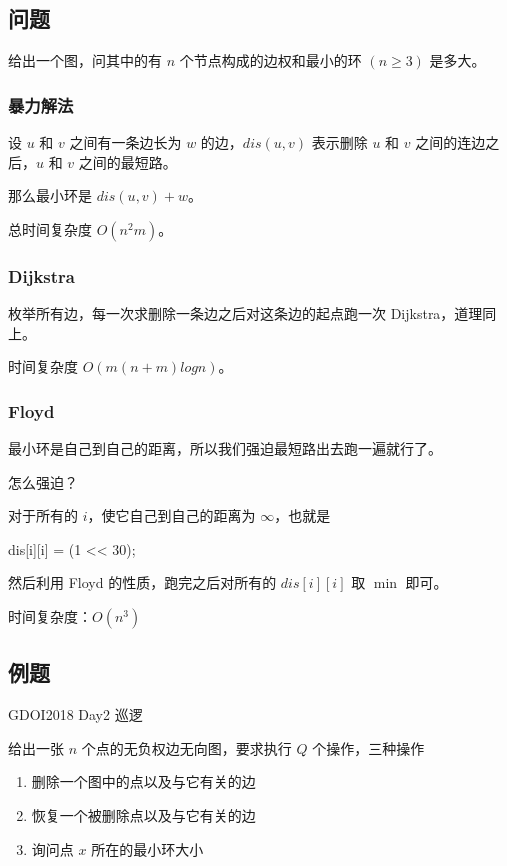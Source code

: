 
\subsection{问题}

给出一个图，问其中的有 $n$ 个节点构成的边权和最小的环 $(n\ge 3)$ 是多大。

\subsubsection{暴力解法}

设 $u$ 和 $v$ 之间有一条边长为 $w$ 的边，$dis(u,v)$ 表示删除 $u$ 和 $v$ 之间的连边之后，$u$ 和 $v$ 之间的最短路。

那么最小环是 $dis(u,v)+w$。

总时间复杂度 $O(n^2m)$。

\subsubsection{Dijkstra}

枚举所有边，每一次求删除一条边之后对这条边的起点跑一次 Dijkstra，道理同上。

时间复杂度 $O(m(n+m)logn)$。

\subsubsection{Floyd}

最小环是自己到自己的距离，所以我们强迫最短路出去跑一遍就行了。

怎么强迫？

对于所有的 $i$，使它自己到自己的距离为 $\infty$，也就是

\begin{cppcode}
dis[i][i] = (1 << 30);
\end{cppcode}

然后利用 Floyd 的性质，跑完之后对所有的 $dis[i][i]$ 取 $\min$ 即可。

时间复杂度：$O(n^3)$

\subsection{例题}

GDOI2018 Day2 巡逻

给出一张 $n$ 个点的无负权边无向图，要求执行 $Q$ 个操作，三种操作

\begin{enumerate}
\item 删除一个图中的点以及与它有关的边
\item 恢复一个被删除点以及与它有关的边
\item 询问点 $x$ 所在的最小环大小
\end{enumerate}

